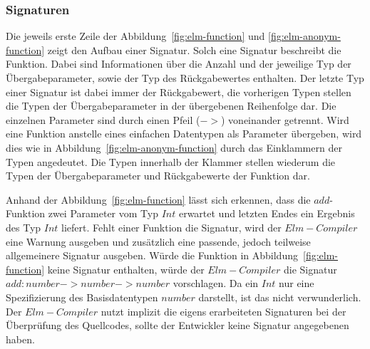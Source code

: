 \subsubsection{Signaturen}
\label{sec:Signaturen}
Die jeweils erste Zeile der Abbildung~\ref{fig:elm-function} und \ref{fig:elm-anonym-function} zeigt den Aufbau einer Signatur. Solch eine Signatur beschreibt die Funktion. Dabei sind Informationen über die Anzahl und der jeweilige Typ der Übergabeparameter, sowie der Typ des Rückgabewertes enthalten. Der letzte Typ einer Signatur ist dabei immer der Rückgabewert, die vorherigen Typen stellen die Typen der Übergabeparameter in der übergebenen Reihenfolge dar. Die einzelnen Parameter sind durch einen Pfeil ($->$) voneinander getrennt. Wird eine Funktion anstelle eines einfachen Datentypen als Parameter übergeben, wird dies wie in Abbildung~\ref{fig:elm-anonym-function} durch das Einklammern der Typen angedeutet. Die Typen innerhalb der Klammer stellen wiederum die Typen der Übergabeparameter und Rückgabewerte der Funktion dar.

Anhand der Abbildung~\ref{fig:elm-function} lässt sich erkennen, dass die $add$-Funktion zwei Parameter vom Typ $Int$ erwartet und letzten Endes ein Ergebnis des Typ $Int$ liefert. Fehlt einer Funktion die Signatur, wird der $Elm-Compiler$ eine Warnung ausgeben und zusätzlich eine passende, jedoch teilweise allgemeinere Signatur ausgeben. Würde die Funktion in Abbildung~\ref{fig:elm-function} keine Signatur enthalten, würde der $Elm-Compiler$ die Signatur $add : number -> number -> number$ vorschlagen. Da ein $Int$ nur eine Spezifizierung des Basisdatentypen $number$ darstellt, ist das nicht verwunderlich. Der $Elm-Compiler$ nutzt implizit die eigens erarbeiteten Signaturen bei der Überprüfung des Quellcodes, sollte der Entwickler keine Signatur angegebenen haben.

